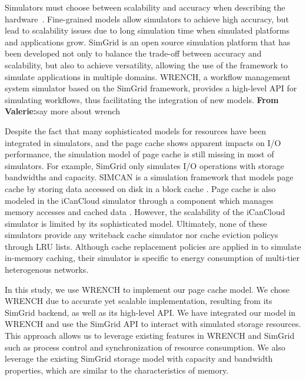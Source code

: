 \documentclass[conference]{IEEEtran}
\newcommand{\valerie}[1]{\color{blue}\textbf{From Valerie:}#1\color{black}}
\begin{document}
            Simulators must choose between scalability and accuracy when describing the
            hardware~\cite{casanova2014simgrid}. 
            Fine-grained models allow simulators to achieve high accuracy, 
            but lead to scalability issues due to long simulation time 
            when simulated platforms and applications grow. 
            SimGrid is an open source simulation platform that has been developed 
            not only to balance the trade-off between accuracy and scalability, 
            but also to achieve versatility, allowing the use of the framework 
            to simulate applications in multiple domains. WRENCH, a workflow management
            system simulator based on the SimGrid framework, provides a high-level API
            for simulating workflows, thus facilitating the integration of new models.
            \valerie{say more about wrench}
            
            Despite the fact that many sophisticated models for resources have been 
            integrated in simulators, and the page cache shows apparent impacts on I/O
            performance, the simulation model of page cache is still missing in most 
            of simulators.
            For example, SimGrid only simulates I/O operations with storage bandwidths 
            and capacity. 
            SIMCAN is a simulation framework that models page cache by storing data 
            accessed on disk in a block cache \cite{nunez2012simcan}. 
            Page cache is also modeled in the iCanCloud simulator through a component which
            manages memory accesses and cached data \cite{nunez2012icancloud}. However,
            the scalability of the iCanCloud simulator is limited by its sophisticated model.
            Ultimately, none of these simulators provide any writeback cache simulator nor
            cache eviction policys through LRU lists.
            Although cache replacement policies are applied in \cite{xu2018saving} to simulate 
            in-memory caching, their simulator is specific to energy consumption of multi-tier 
            heterogenous networks.
            

            In this study, we use WRENCH 
            to implement our page cache model. We chose WRENCH due to accurate yet scalable implementation, resulting
            from its SimGrid backend, as well as its high-level API.
            We have integrated our model in WRENCH and use the SimGrid API to interact with 
            simulated storage resources.
            This approach allows us to leverage existing features in WRENCH and SimGrid such as process control and synchronization of 
            resource consumption.
            We also leverage the existing SimGrid storage model with capacity 
            and bandwidth properties, which are similar to the characteristics of memory.
            
\end{document}
